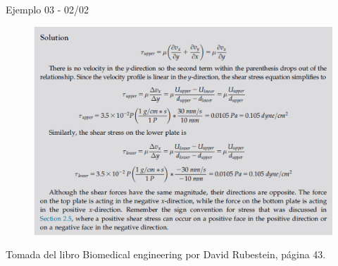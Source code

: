 \begin{frame}{Ejemplo 03 - 02/02}
\justifying
\begin{figure}[H]
\centering
\includegraphics[scale=0.4]{Section_Files/picmanuel/26.png}
\label{fig: Figura2-24}
\end{figure}
{\tiny Tomada del libro Biomedical engineering por David Rubestein, página 43.}
\end{frame}

